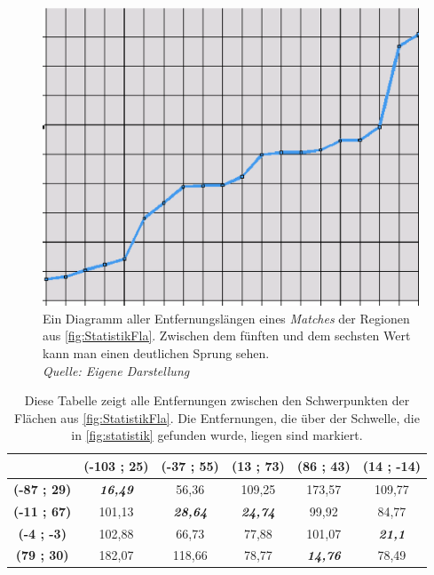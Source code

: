 \begin{figure}
	\centering
	\includegraphics[scale=0.7]{StatistikDia.eps}
	\caption[Diagramm einer statistischen Analyse]{Ein Diagramm aller Entfernungslängen eines \textit{Matches} der Regionen aus \vref{fig:StatistikFla}. Zwischen dem fünften und dem sechsten Wert kann man einen deutlichen Sprung sehen.\\\textit{Quelle: Eigene Darstellung}}
\label{fig:statistik}
\end{figure}

\begin{table}
\caption{Diese Tabelle zeigt alle Entfernungen zwischen den Schwerpunkten der Flächen aus \vref{fig:StatistikFla}. Die Entfernungen, die über der Schwelle, die in \vref{fig:statistik} gefunden wurde, liegen sind markiert.}
\begin{tabular}{|c|c|c|c|c|c|}
\hline
&\textbf{(-103 ; 25)}&\textbf{(-37 ; 55)}&\textbf{(13 ; 73)}&\textbf{(86 ; 43)}&\textbf{(14 ; -14)}\\
\hline
\textbf{(-87 ; 29)}&\textbf{\textit{16,49}}&56,36&109,25&173,57&109,77\\
\hline
\textbf{(-11 ; 67)}&101,13&\textbf{\textit{28,64}}&\textbf{\textit{24,74}}&99,92&84,77\\
\hline
\textbf{(-4 ; -3)}&102,88&66,73&77,88&101,07&\textbf{\textit{21,1}}\\
\hline
\textbf{(79 ; 30)}&182,07&118,66&78,77&\textbf{\textit{14,76}}&78,49\\
\hline

\end{tabular} 
\end{table}


